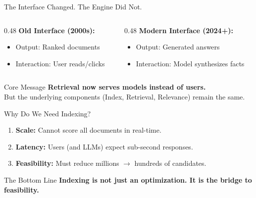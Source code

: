 \documentclass[aspectratio=169]{beamer}
\newif\ifanimated
\newcommand{\cpause}{\ifanimated\pause\fi}
\begin{document}
\begin{frame}{The Interface Changed. The Engine Did Not.}
\begin{columns}[T,onlytextwidth]
\begin{column}{0.48\textwidth}
\textbf{Old Interface (2000s):}
\begin{itemize}
    \item Output: Ranked documents
    \item Interaction: User reads/clicks
\end{itemize}

\begin{center}

\end{center}
\end{column}

\begin{column}{0.48\textwidth}
\textbf{Modern Interface (2024+):}
\begin{itemize}
    \item Output: Generated answers
    \item Interaction: Model synthesizes facts
\end{itemize}

\begin{center}

\end{center}
\end{column}
\end{columns}

\vspace{1em}
\begin{alertblock}{Core Message}
\textbf{Retrieval now serves models instead of users.} \\
But the underlying components (Index, Retrieval, Relevance) remain the same.
\end{alertblock}
\cpause
\end{frame}

\begin{frame}{Why Do We Need Indexing?}
\begin{enumerate}
    \item \textbf{Scale:} Cannot score all documents in real-time.
    \item \textbf{Latency:} Users (and LLMs) expect sub-second responses.
    \item \textbf{Feasibility:} Must reduce millions $\rightarrow$ hundreds of candidates.
\end{enumerate}

\vspace{1em}

\begin{center}

\end{center}

\vspace{2em}

\begin{exampleblock}{The Bottom Line}
\textbf{Indexing is not just an optimization. It is the bridge to feasibility.}
\end{exampleblock}
\cpause
\end{frame}
\end{document}
